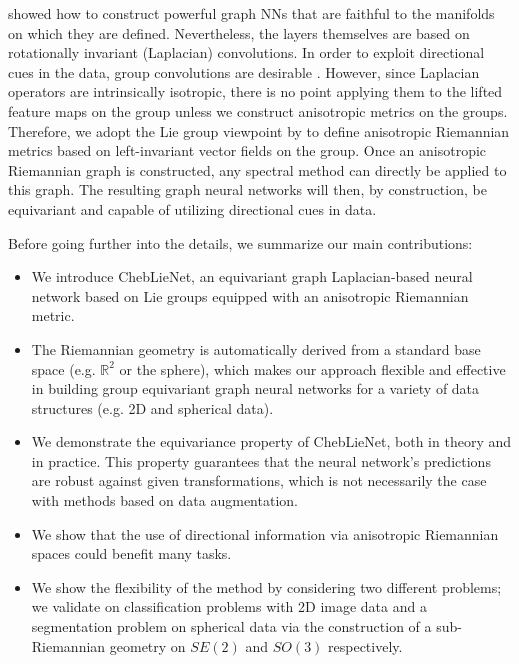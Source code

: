 \documentclass{article}
\begin{document}
\citet{defferrard2020deepsphere} showed how to construct powerful graph NNs that are faithful to the manifolds on which they are defined. Nevertheless, the layers themselves are based on rotationally invariant (Laplacian) convolutions. In order to exploit directional cues in the data, group convolutions are desirable \citep{cohen2018general, kondor2018generalization, cohen2016gcnn,bekkers2019b}. However, since Laplacian operators are intrinsically isotropic, there is no point applying them to the lifted feature maps on the group unless we  construct anisotropic metrics on the groups. Therefore, we adopt the Lie group viewpoint by \citet{sanguinetti2015fastmarching} to define anisotropic Riemannian metrics based on left-invariant vector fields on the group. Once an anisotropic Riemannian graph is constructed, any spectral method can directly be applied to this graph. The resulting graph neural networks will then, by construction, be equivariant and capable of utilizing directional cues in data.


Before going further into the details, we summarize our main contributions:
\begin{itemize}
\item We introduce ChebLieNet, an equivariant graph Laplacian-based neural network based on Lie groups equipped with an anisotropic Riemannian metric. 
\item The Riemannian geometry is automatically derived from a standard base space (e.g. $\mathbb{R}^2$ or the sphere), which makes our approach flexible and effective in building group equivariant graph neural networks for a variety of data structures (e.g. 2D and spherical data).
\item We demonstrate the equivariance property of ChebLieNet, both in theory and in practice. This property guarantees that the neural network's predictions are robust against given transformations, which is not necessarily the case with methods based on data augmentation.
\item We show that the use of directional information via anisotropic Riemannian spaces could benefit many tasks. 
\item We show the flexibility of the method by considering two different problems; we validate on classification problems with 2D image data and a segmentation problem on spherical data via the construction of a sub-Riemannian geometry on $SE(2)$ and $SO(3)$ respectively.%
\end{itemize}
\end{document}
